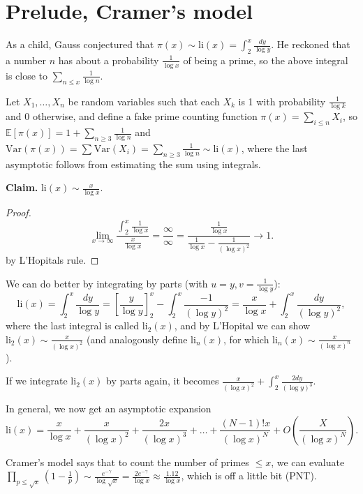\documentclass{article}
\theoremstyle{definition}
\begin{document}
\section{Prelude, Cramer's model}

As a child, Gauss conjectured that $\pi(x) \sim \text{li}(x) = \int_{2}^{x} \frac{dy}{\log y}$. He reckoned that a number $n$ has about a probability $\frac{1}{\log x}$ of being a prime, so the above integral is close to $\sum_{n\le x}^{} \frac{1}{\log n}$.

\vspace{1mm}

Let $X_1, \ldots, X_n$ be random variables such that each $X_k$ is 1 with probability $\frac{1}{\log k}$ and 0 otherwise, and define a fake prime counting function $\pi(x) = \sum_{i\le n}^{} X_i$, so $\mathbb{E}[\pi(x)] = 1 + \sum_{n \ge 3}^{} \frac{1}{\log n}$ and $\text{Var}(\pi(x)) = \sum_{}^{} \text{Var}(X_i) = \sum_{n \ge 3}^{} \frac{1}{\log n} \sim \text{li}(x)$, where the last asymptotic follows from estimating the sum using integrals.

\vspace{1mm}

\textbf{Claim.} $\text{li}(x) \sim \frac{x}{\log x}$. 

\begin{proof}
    \[
    \lim_{x \to \infty}\frac{\int_{2}^{x} \frac{1}{\log x}}{\frac{x}{\log x}} = \frac{\infty}{\infty} = \frac{\frac{1}{\log x}}{\frac{1}{\log x} - \frac{1}{(\log x)^2}} \to 1.
    \] by L'Hopitals rule.
\end{proof}

We can do better by integrating by parts (with $u=y, v= \frac{1}{\log y}$):
\[
\text{li}(x) = \int_{2}^{x} \frac{dy}{\log y} = \left[\frac{y}{\log y}\right]^x_2 - \int_{2}^{x} \frac{-1}{(\log y)^2} = \frac{x}{\log x} + \int_{2}^{x} \frac{dy}{(\log y)^2},
\]
where the last integral is called $\text{li}_2(x)$, and by L'Hopital we can show $\text{li}_2(x) \sim \frac{x}{(\log x)^2}$ (and analogously define $\text{li}_n(x)$, for which $\text{li}_n(x) \sim \frac{x}{(\log x)^n}$).

If we integrate $\text{li}_2(x)$ by parts again, it becomes $\frac{x}{(\log x)^2} + \int_{2}^{x} \frac{2dy}{(\log y)^3}$.

In general, we now get an asymptotic expansion
\[
\text{li}(x) = \frac{x}{\log x} + \frac{x}{(\log x)^2} + \frac{2x}{(\log x)^3} + \ldots + \frac{(N-1)!x}{(\log x)^N} + O\left(\frac{X}{(\log x)^N} \right).
\]

Cramer's model says that to count the number of primes $\le x$, we can evaluate $\prod_{p \le \sqrt{x}}^{} (1 - \frac{1}{p}) \sim \frac{e^{-\gamma}}{\log \sqrt{x}} = \frac{2e^{-\gamma}}{\log x} \approx \frac{1.12}{\log x}$, which is off a little bit (PNT).
\end{document}
